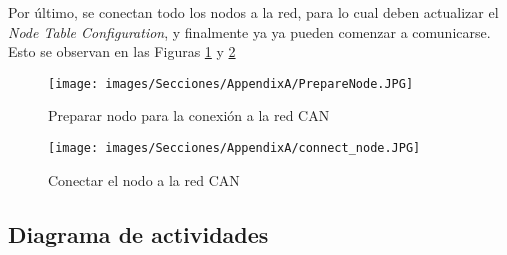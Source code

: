 Por último, se conectan todo los nodos a la red, para lo cual deben
actualizar el \textit{Node Table Configuration}, y finalmente ya
ya pueden comenzar a comunicarse. Esto se observan en las Figuras
\ref{fig:PrepareNodeC5} y \ref{fig:ConnectNodeC5}

\begin{figure}[h!]
 \centering
 \texttt{[image: images/Secciones/AppendixA/PrepareNode.JPG]}
  \caption{Preparar nodo para la conexión a la red CAN}
  \label{fig:PrepareNodeC5}
\end{figure}

\begin{figure}[h!]
 \centering
 \texttt{[image: images/Secciones/AppendixA/connect\_node.JPG]}
  \caption{Conectar el nodo a la red CAN}
  \label{fig:ConnectNodeC5}
\end{figure}

\subsection{Diagrama de actividades}






